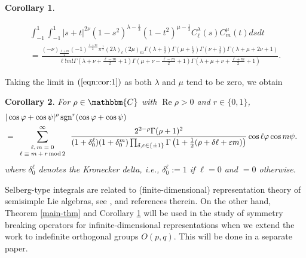 \documentclass{article}
\numberwithin{equation}{section}
\newcommand{\assign}{:=}
\newcommand{\tmdummy}{$\mbox{}$}
\newcommand{\tmop}[1]{\ensuremath{\operatorname{#1}}}
\newcommand{\tmscript}[1]{\text{\scriptsize{$#1$}}}
\newtheorem{corollary}{Corollary}[section]
{\theorembodyfont{\rmfamily}\newtheorem{example}[corollary]{Example}}
\begin{document}
\begin{corollary}
  \label{cor:1}{\tmdummy}
  
  \begin{eqnarray}
    & \displaystyle\int_{- 1}^1 \displaystyle\int_{- 1}^1 | s + t |^{2 \nu} (1 - s^2)^{\lambda -
    \frac{1}{2}} (1 - t^2)^{\mu - \frac{1}{2}} C_{\ell}^{\lambda} (s)
    C_m^{\mu} (t) d s d t &  \nonumber\\
    & = \frac{(- \nu)_{\frac{\ell + m}{2}} (- 1)^{\frac{\ell + m}{2}}
    \pi^{\frac{1}{2}} (2 \lambda)_{\ell} (2 \mu)_m \Gamma \left( \lambda +
    \frac{1}{2} \right) \Gamma \left( \mu + \frac{1}{2} \right) \Gamma \left(
    \nu + \frac{1}{2} \right) \Gamma (\lambda + \mu + 2 \nu + 1)}{\ell !m!
    \Gamma \left( \lambda + \nu + \frac{\ell - m}{2} + 1 \right) \Gamma \left(
    \mu + \nu - \frac{\ell - m}{2} + 1 \right) \Gamma \left( \lambda + \mu +
    \nu + \frac{\ell + m}{2} + 1 \right)}  \label{eqn:cor:1} . & 
  \end{eqnarray}
\end{corollary}

Taking the limit in $(\ref{eqn:cor:1})$ as both $\lambda$ and
$\mu$ tend to be
zero, we obtain

\begin{corollary}
  \label{cor:170599}For $\rho \in \mathbbm{C}$ with $\tmop{Re} \rho > 0$ and
  $r \in \{ 0, 1 \}$,
  \begin{eqnarray}
    & | \cos \varphi + \cos \psi |^{\rho} \tmop{sgn}^r (\cos \varphi + \cos
    \psi) &  \nonumber\\
    & = \sum_{\tmscript{\begin{array}{c}
      \ell, m = 0\\
      \ell \equiv m + r \tmop{mod} 2
    \end{array}}}^{\infty} \frac{2^{2 - \rho} \Gamma (\rho + 1)^2}{(1 +
    \delta_0^{\ell}) (1 + \delta_0^m) \prod_{\delta, \varepsilon \in \{ \pm 1
    \}} \Gamma \left( 1 + \frac{1}{2} (\rho + \delta \ell + \varepsilon m)
    \right)} \cos \ell \varphi \cos m \psi . &  \nonumber
  \end{eqnarray}
  where
  $\delta_0^\ell$ denotes the Kronecker delta, i.e.,
  $\delta_0^{\ell} \assign 1$ if $\ell = 0$ and $= 0$ otherwise.
\end{corollary}

Selberg-type integrals are related to (finite-dimensional) representation
theory of semisimple Lie algebras, see {\cite{forrester2008importance}},
{\cite{tarasov2003selberg}} and references therein. On the other hand, Theorem
\ref{main-thm} and Corollary \ref{cor:1} will be used in the study of symmetry
breaking operators for infinite-dimensional representations when we extend the
work {\cite{kobayashi2015symmetry}} to indefinite orthogonal groups $O (p,
q)$. This will be done in a separate paper.
\end{document}
